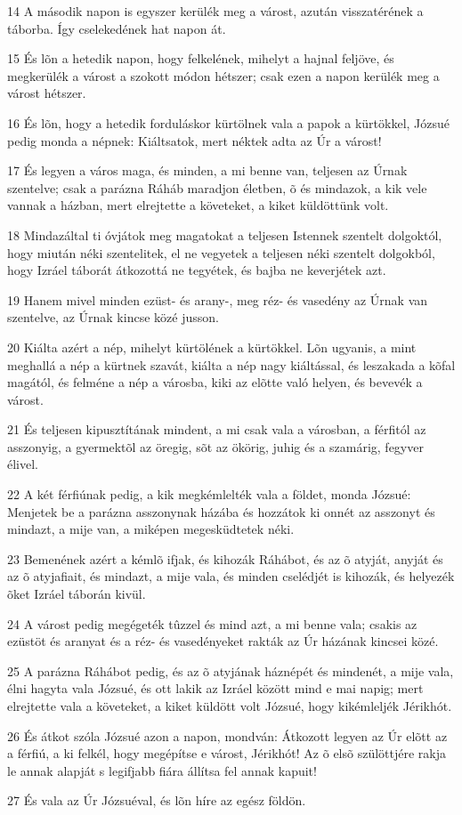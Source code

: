 \par 14 A második napon is egyszer kerülék meg a várost, azután visszatérének a táborba. Így cselekedének hat napon át.
\par 15 És lõn a hetedik napon, hogy felkelének, mihelyt a hajnal feljöve, és megkerülék a várost a szokott módon hétszer; csak ezen a napon kerülék meg a várost hétszer.
\par 16 És lõn, hogy a hetedik forduláskor kürtölnek vala a papok a kürtökkel, Józsué pedig monda a népnek: Kiáltsatok, mert néktek adta az Úr a várost!
\par 17 És legyen a város maga, és minden, a mi benne van, teljesen az Úrnak szentelve; csak a parázna Ráháb maradjon életben, õ és mindazok, a kik vele vannak a házban, mert elrejtette a követeket, a kiket küldöttünk volt.
\par 18 Mindazáltal ti óvjátok meg magatokat a teljesen Istennek szentelt dolgoktól, hogy miután néki szentelitek, el ne vegyetek a teljesen néki szentelt dolgokból, hogy Izráel táborát átkozottá ne tegyétek, és bajba ne keverjétek azt.
\par 19 Hanem mivel minden ezüst- és arany-, meg réz- és vasedény az Úrnak van szentelve, az Úrnak kincse közé jusson.
\par 20 Kiálta azért a nép, mihelyt kürtölének a kürtökkel. Lõn ugyanis, a mint meghallá a nép a kürtnek szavát, kiálta a nép nagy kiáltással, és leszakada a kõfal magától, és felméne a nép a városba, kiki az elõtte való helyen,  és bevevék a várost.
\par 21 És teljesen kipusztítának mindent, a mi csak vala a városban, a férfitól az asszonyig, a gyermektõl az öregig, sõt az ökörig, juhig és a szamárig, fegyver élivel.
\par 22 A két férfiúnak pedig, a kik megkémlelték vala a földet, monda Józsué: Menjetek be a parázna asszonynak házába és hozzátok ki onnét az asszonyt és mindazt, a mije van, a miképen megesküdtetek néki.
\par 23 Bemenének azért a kémlõ ifjak, és kihozák Ráhábot, és az õ atyját, anyját és az õ atyjafiait, és mindazt, a mije vala, és minden cselédjét is kihozák, és helyezék õket Izráel táborán kivül.
\par 24 A várost pedig megégeték tûzzel és mind azt, a mi benne vala; csakis az ezüstöt és aranyat és a réz- és vasedényeket rakták az Úr házának kincsei közé.
\par 25 A parázna Ráhábot pedig, és az õ atyjának háznépét és mindenét, a mije vala, élni hagyta vala  Józsué, és ott lakik az Izráel között mind e mai napig; mert elrejtette vala a követeket, a kiket küldött volt Józsué, hogy kikémleljék Jérikhót.
\par 26 És átkot szóla Józsué azon a napon, mondván: Átkozott legyen az Úr elõtt az a férfiú, a ki felkél, hogy megépítse e várost, Jérikhót! Az õ elsõ szülöttjére rakja le annak alapját s legifjabb fiára állítsa fel annak kapuit!
\par 27 És vala az Úr Józsuéval, és lõn híre az egész földön.

